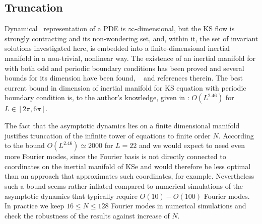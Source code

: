 

\subsection{Truncation}

Dynamical \statesp\ representation of a PDE is $\infty$-dimensional,
but the KS flow is strongly contracting and its non-wondering set,
and, within it, the set of invariant solutions investigated here, is
embedded into a finite-dimensional inertial manifold in
a non-trivial, nonlinear way. The existence of an inertial manifold for
\KSe with both odd and periodic boundary conditions has been proved and
several bounds for its dimension have been found, \cf\  and references
therein. The best current bound in dimension of inertial manifold for KS
equation with periodic boundary condition is, to the author's knowledge,
given in : $O(L^{2.46})$ for $L\in[2\pi,6\pi]$.

The fact that the asymptotic dynamics lies on a finite
dimensional manifold justifies truncation of the infinite tower
of equations  to finite order $N$. According to
the bound $O(L^{2.46})\simeq2000$ for $L=22$ and we would expect to need even more
Fourier modes, since the Fourier basis is not directly
connected to coordinates on the inertial manifold of KSe and
would therefore be less optimal than an approach that
approximates such coordinates, for
example.
Nevertheless such a bound seems rather inflated compared to
numerical simulations of the asymptotic dynamics that typically
require $O(10)-O(100)$ Fourier modes. In practice we keep
$16\leq N \leq 128$ Fourier modes in numerical simulations and
check the robustness of the results against increase of $N$.

